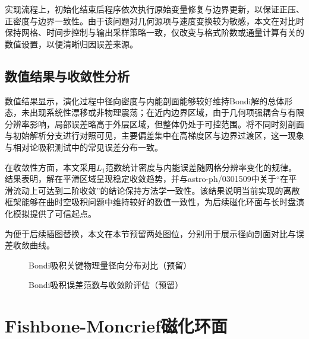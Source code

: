 实现流程上，初始化结束后程序依次执行原始变量修复与边界更新，以保证正压、正密度与边界一致性。由于该问题对几何源项与速度变换较为敏感，本文在对比时保持网格、时间步控制与输出采样策略一致，仅改变与格式阶数或通量计算有关的数值设置，以便清晰归因误差来源。

\subsection{数值结果与收敛性分析}
数值结果显示，演化过程中径向密度与内能剖面能够较好维持Bondi解的总体形态，未出现系统性漂移或非物理震荡；在近内边界区域，由于几何项强耦合与有限分辨率影响，局部误差略高于外层区域，但整体仍处于可控范围。将不同时刻剖面与初始解析分支进行对照可见，主要偏差集中在高梯度区与边界过渡区，这一现象与相对论吸积测试中的常见误差分布一致。

在收敛性方面，本文采用$L_1$范数统计密度与内能误差随网格分辨率变化的规律。结果表明，解在平滑区域呈现稳定收敛趋势，并与astro-ph/0301509中关于“在平滑流动上可达到二阶收敛”的结论保持方法学一致性。该结果说明当前实现的离散框架能够在曲时空吸积问题中维持较好的数值一致性，为后续磁化环面与长时盘演化模拟提供了可信起点。

为便于后续插图替换，本文在本节预留两处图位，分别用于展示径向剖面对比与误差收敛曲线。

\begin{figure}[htbp]
	\centering
	\caption{Bondi吸积关键物理量径向分布对比（预留）}
	\label{fig:bondi-profile-placeholder}
\end{figure}

\begin{figure}[htbp]
	\centering
	\caption{Bondi吸积误差范数与收敛阶评估（预留）}
	\label{fig:bondi-conv-placeholder}
\end{figure}

\section{Fishbone-Moncrief磁化环面}
